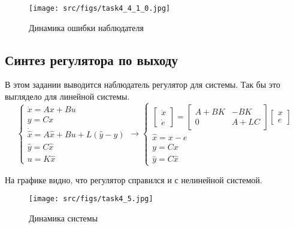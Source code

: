 \begin{figure}[ht!]
    \centering
    \texttt{[image: src/figs/task4\_4\_1\_0.jpg]}
    \caption{Динамика ошибки наблюдателя}
    \label{fig:task4_4_3}
\end{figure}
\FloatBarrier

\subsection{Синтез регулятора по выходу}
В этом задании выводится наблюдатель регулятор для системы. Так бы это выглядело для линейной системы.
\[
        \begin{cases}
                \dot{x} = A x + B u\\
                y = C x \\
                \dot{\hat{x}} = A \hat{x} + B u + L(\hat{y} - y) \\
                \hat{y} = C \hat{x} \\
                u = K \hat{x}
        \end{cases} \rightarrow
        \begin{cases}
            \begin{bmatrix} 
                \dot{x} \\
                \dot{e}
            \end{bmatrix} = 
            \begin{bmatrix} 
                A + BK & -BK\\
                0 & A + LC
            \end{bmatrix}
            \begin{bmatrix} 
              x \\
              e
          \end{bmatrix} 
            \\
            \hat{x} = x - e \\
            y = Cx \\
            \hat{y} = C \hat{x}
         \end{cases}
\]

На графике видно, что регулятор справился и с нелинейной системой.
\begin{figure}[ht!]
    \centering
    \texttt{[image: src/figs/task4\_5.jpg]}
    \caption{Динамика системы}
    \label{fig:task4_5}
\end{figure}
\FloatBarrier

\FloatBarrier